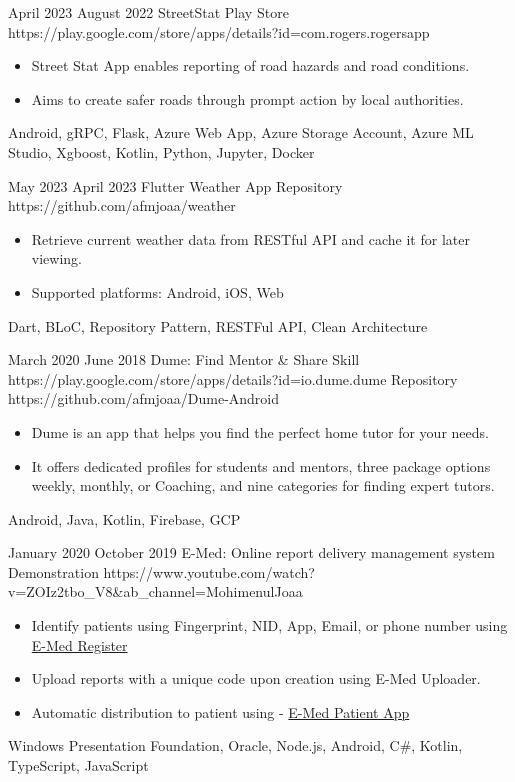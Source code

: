 \begin{universalList}
  \emptySeparator
  \universalListItemWithoutLink
    {April 2023}
    {August 2022}
    {StreetStat}
    {Play Store}
    {https://play.google.com/store/apps/details?id=com.rogers.rogersapp}
    {
      \begin{itemize}
        \item Street Stat App enables reporting of road hazards and road conditions.
        \item Aims to create safer roads through prompt action by local authorities.
      \end{itemize}
    }
    {Android, gRPC, Flask, Azure Web App, Azure Storage Account, Azure ML Studio, Xgboost, Kotlin, Python, Jupyter, Docker}

  \emptySeparator
  \universalListItemWithoutLink
    {May 2023}
    {April 2023}
    {Flutter Weather App}
    {Repository}
    {https://github.com/afmjoaa/weather}
    {
      \begin{itemize}
        \item Retrieve current weather data from RESTful API and cache it for later viewing.
        \item Supported platforms: Android, iOS, Web
      \end{itemize}
    }
    {Dart, BLoC, Repository Pattern, RESTFul API, Clean Architecture}

  \emptySeparator
  \universalListItem
    {March 2020}
    {June 2018}
    {Dume: Find Mentor \& Share Skill}
    {https://play.google.com/store/apps/details?id=io.dume.dume}
    {Repository}
    {https://github.com/afmjoaa/Dume-Android}
    {
      \begin{itemize}
        \item Dume is an app that helps you find the perfect home tutor for your needs.
        \item It offers dedicated profiles for students and mentors, three package options weekly, monthly, or Coaching, and nine categories for finding expert tutors.
      \end{itemize}
    }
    {Android, Java, Kotlin, Firebase, GCP}

  \emptySeparator
  \universalListItemWithoutLink
    {January 2020}
    {October 2019}
    {E-Med: Online report delivery management system}
    {Demonstration}
    {https://www.youtube.com/watch?v=ZOIz2tbo_V8&ab_channel=MohimenulJoaa}
    {
      \begin{itemize}
        \item Identify patients using Fingerprint, NID, App, Email, or phone number using \href{https://github.com/afmjoaa/E-Med-Uploader}{E-Med Register \linkIcon}
        \item Upload reports with a unique code upon creation using E-Med Uploader.
        \item Automatic distribution to patient using - \href{https://play.google.com/store/apps/details?id=io.emed.emedpatient}{E-Med Patient App \linkIcon}
      \end{itemize}
    }
    {Windows Presentation Foundation, Oracle, Node.js, Android, C\#, Kotlin, TypeScript, JavaScript}

\end{universalList}
